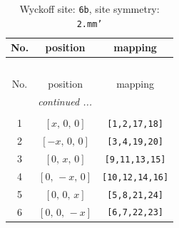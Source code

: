\documentclass[fleqn,8pt]{jsarticle}
\begin{document}
\renewcommand{\arraystretch}{1.2}
\begin{longtable}{ccc}
\caption{Wyckoff site: {\tt 6b}, site symmetry: {\tt 2.mm'}}
 \\
 \hline \hline
No. & position & mapping \\ \hline \endfirsthead

\multicolumn{2}{l}{\tablename\ \thetable{}} \\
 \hline \hline
No. & position & mapping \\ \hline \endhead

 \hline \hline
\multicolumn{2}{r}{\footnotesize\it continued ...} \\ \endfoot

 \hline \hline
\multicolumn{2}{r}{} \\ \endlastfoot

1 & $\left[ x,\, 0,\, 0 \right]$ & {\tt [1,2,17,18]} \\ \hline
2 & $\left[ - x,\, 0,\, 0 \right]$ & {\tt [3,4,19,20]} \\ \hline
3 & $\left[ 0,\, x,\, 0 \right]$ & {\tt [9,11,13,15]} \\ \hline
4 & $\left[ 0,\, - x,\, 0 \right]$ & {\tt [10,12,14,16]} \\ \hline
5 & $\left[ 0,\, 0,\, x \right]$ & {\tt [5,8,21,24]} \\ \hline
6 & $\left[ 0,\, 0,\, - x \right]$ & {\tt [6,7,22,23]} \\
\end{longtable}
\renewcommand{\arraystretch}{1.2}
\end{document}
